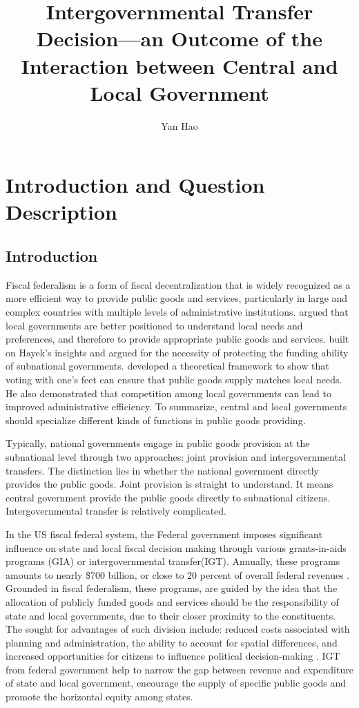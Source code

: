 \documentclass[man]{apa7}
\title{Intergovernmental Transfer Decision---an Outcome of the Interaction between Central and Local Government}
\author{Yan Hao}
\affiliation{Pennsylvania State University\\School of Public Affairs}
\begin{document}
\maketitle

\section{Introduction and Question Description}

\subsection{Introduction}

Fiscal federalism is a form of fiscal decentralization that is widely recognized as a more efficient way to provide public goods and services, particularly in large and complex countries with multiple levels of administrative institutions. \Textcite{hayek2009use} argued that local governments are better positioned to understand local needs and preferences, and therefore to provide appropriate public goods and services. \Textcite{stigler1998tenable} built on Hayek's insights and argued for the necessity of protecting the funding ability of subnational governments. \Textcite{tiebout1956pure} developed a theoretical framework to show that voting with one's feet can ensure that public goods supply matches local needs. He also demonstrated that competition among local governments can lead to improved administrative efficiency. To summarize, central and local governments should specialize different kinds of functions in public goods providing.


Typically, national governments engage in public goods provision at the subnational level through two approaches: joint provision and intergovernmental transfers. The distinction lies in whether the national government directly provides the public goods. Joint provision is straight to understand. It means central government provide the public goods directly to subnational citizens. Intergovernmental transfer is relatively complicated.

In the US fiscal federal system, the Federal government imposes significant influence on state and local fiscal decision making through various grants-in-aids programs (GIA) or intergovernmental transfer(IGT). Annually, these programs amounts to nearly \$700 billion, or close to 20 percent of overall federal revenues \parencite{dilger2015federal}. Grounded in fiscal federalism, these programs, are guided by the idea that the allocation of publicly funded goods and services should be the responsibility of state and local governments, due to their closer proximity to the constituents. The sought for advantages of such division include: reduced costs associated with planning and administration, the ability to account for spatial differences, and increased opportunities for citizens to influence political decision-making \parencite{musgrave1997devolution}. IGT from federal government help to narrow the gap between revenue and expenditure of state and local government, encourage the supply of specific public goods and promote the horizontal equity among states.
\end{document}
